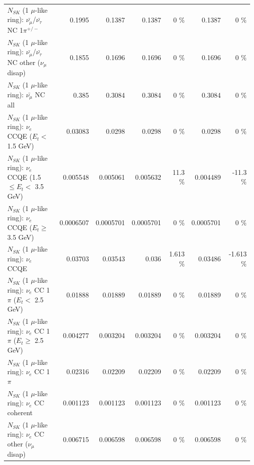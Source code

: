 \begin{table}
\begin{tabular}{| l | r | r | r  r | r  r |}
\hline
  $N_{SK}$ (1 $\mu$-like ring): $\bar{\nu_\mu}$/$\bar{\nu_\tau}$ NC 1$\pi^{+/-}$ &          0.1995 &          0.1387 &          0.1387 &        0 \%  &          0.1387 &        0 \%  \\ 
$N_{SK}$ (1 $\mu$-like ring): $\bar{\nu_\mu}$/$\bar{\nu_\tau}$ NC other ($\nu_\mu$ disap) &          0.1855 &          0.1696 &          0.1696 &        0 \%  &          0.1696 &        0 \%  \\ 
                          $N_{SK}$ (1 $\mu$-like ring): $\bar{\nu_{\mu}}$ NC all &           0.385 &          0.3084 &          0.3084 &        0 \%  &          0.3084 &        0 \%  \\ 
\hline
\hline
\hline
                  $N_{SK}$ (1 $\mu$-like ring): $\nu_e$ CCQE ($E_{t} <$ 1.5 GeV) &         0.03083 &          0.0298 &          0.0298 &        0 \%  &          0.0298 &        0 \%  \\ 
         $N_{SK}$ (1 $\mu$-like ring): $\nu_e$ CCQE (1.5 $\leq E_{t} <$ 3.5 GeV) &        0.005548 &        0.005061 &        0.005632 &     11.3 \%  &        0.004489 &    -11.3 \%  \\ 
               $N_{SK}$ (1 $\mu$-like ring): $\nu_e$ CCQE ($E_{t} \geq$ 3.5 GeV) &       0.0006507 &       0.0005701 &       0.0005701 &        0 \%  &       0.0005701 &        0 \%  \\ 
\hline
                                      $N_{SK}$ (1 $\mu$-like ring): $\nu_e$ CCQE &         0.03703 &         0.03543 &           0.036 &    1.613 \%  &         0.03486 &   -1.613 \%  \\ 
\hline
             $N_{SK}$ (1 $\mu$-like ring): $\nu_e$ CC 1$\pi$ ($E_{t} <$ 2.5 GeV) &         0.01888 &         0.01889 &         0.01889 &        0 \%  &         0.01889 &        0 \%  \\ 
          $N_{SK}$ (1 $\mu$-like ring): $\nu_e$ CC 1$\pi$ ($E_{t} \geq$ 2.5 GeV) &        0.004277 &        0.003204 &        0.003204 &        0 \%  &        0.003204 &        0 \%  \\ 
\hline
                                 $N_{SK}$ (1 $\mu$-like ring): $\nu_e$ CC 1$\pi$ &         0.02316 &         0.02209 &         0.02209 &        0 \%  &         0.02209 &        0 \%  \\ 
                               $N_{SK}$ (1 $\mu$-like ring): $\nu_e$ CC coherent &        0.001123 &        0.001123 &        0.001123 &        0 \%  &        0.001123 &        0 \%  \\ 
                $N_{SK}$ (1 $\mu$-like ring): $\nu_e$ CC other ($\nu_\mu$ disap) &        0.006715 &        0.006598 &        0.006598 &        0 \%  &        0.006598 &        0 \%  \\ 

\end{tabular}
\end{table}
